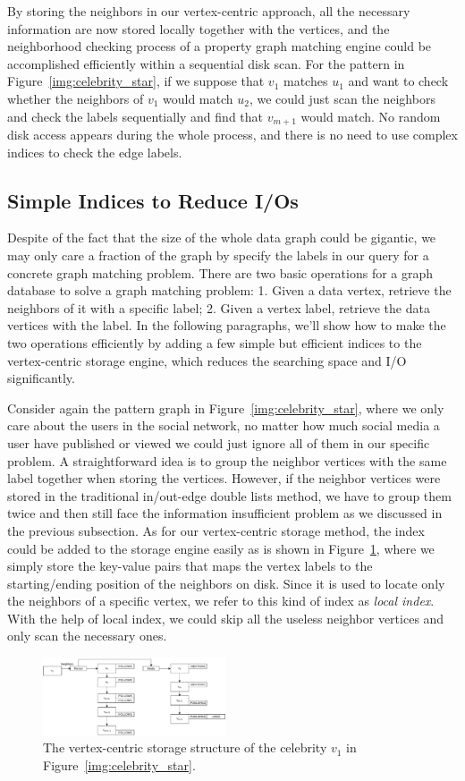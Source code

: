 By storing the neighbors in our vertex-centric approach,
all the necessary information are now stored locally together with the vertices,
and the neighborhood checking process of a property graph matching engine could be accomplished efficiently within a sequential disk scan.
For the pattern in Figure~\ref{img:celebrity_star}, if we suppose that $v_1$ matches $u_1$ and want to check whether the neighbors of $v_1$ would match $u_2$, we could just scan the neighbors and check the labels sequentially and find that $v_{m+1}$ would match.
No random disk access appears during the whole process, and there is no need to use complex indices to check the edge labels.
\subsection{Simple Indices to Reduce I/Os}
Despite of the fact that the size of the whole data graph could be gigantic,
we may only care a fraction of the graph by specify the labels in our query for a concrete graph matching problem.
There are two basic operations for a graph database to solve a graph matching problem:
1. Given a data vertex, retrieve the neighbors of it with a specific label;
2. Given a vertex label, retrieve the data vertices with the label.
In the following paragraphs, we'll show how to make the two operations efficiently by adding a few simple but efficient indices to the vertex-centric storage engine,
which reduces the searching space and I/O significantly.

Consider again the pattern graph in Figure~\ref{img:celebrity_star}, where we only care about the users in the social network,
no matter how much social media a user have published or viewed we could just ignore all of them in our specific problem.
A straightforward idea is to group the neighbor vertices with the same label together when storing the vertices.
However, if the neighbor vertices were stored in the traditional in/out-edge double lists method,
we have to group them twice and then still face the information insufficient problem as we discussed in the previous subsection.
As for our vertex-centric storage method,
the index could be added to the storage engine easily as is shown in Figure~\ref{img:data_neighbors},
where we simply store the key-value pairs that maps the vertex labels to the starting/ending position of the neighbors on disk.
Since it is used to locate only the neighbors of a specific vertex, we refer to this kind of index as \emph{local index}.
With the help of local index, we could skip all the useless neighbor vertices and only scan the necessary ones.
\begin{figure}[ht]
  \centering
  \includegraphics[width=0.48\textwidth]{img/data_neighbors.pdf}
  \caption{The vertex-centric storage structure of the celebrity $v_1$ in Figure~\ref{img:celebrity_star}.}\label{img:data_neighbors}
\end{figure}

